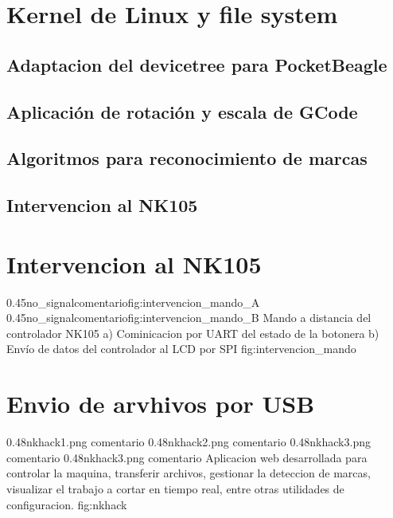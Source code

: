 \section{Kernel de Linux y file system}
   \subsection{Adaptacion del devicetree para PocketBeagle}
\subsection{Aplicación de rotación y escala de GCode}
\subsection{Algoritmos para reconocimiento de marcas}

\subsection{Intervencion al NK105}

\section{Intervencion al NK105}

\subfigab
   {0.45}{no_signal}{comentario}{fig:intervencion_mando_A}
   {0.45}{no_signal}{comentario}{fig:intervencion_mando_B}
         {Mando a distancia del controlador NK105 a) Cominicacion por UART del estado de la botonera b) Envío de datos del controlador al LCD por SPI}
         {fig:intervencion_mando}


\section{Envio de arvhivos por USB}

\subfigtwotwo
         {0.48}{nkhack1.png} {comentario}
         {0.48}{nkhack2.png} {comentario}
         {0.48}{nkhack3.png} {comentario}
         {0.48}{nkhack3.png} {comentario}
         {Aplicacion web desarrollada para controlar la maquina, transferir archivos, gestionar la deteccion de marcas, visualizar el trabajo a cortar en tiempo real, entre otras utilidades de configuracion.}
         {fig:nkhack}
